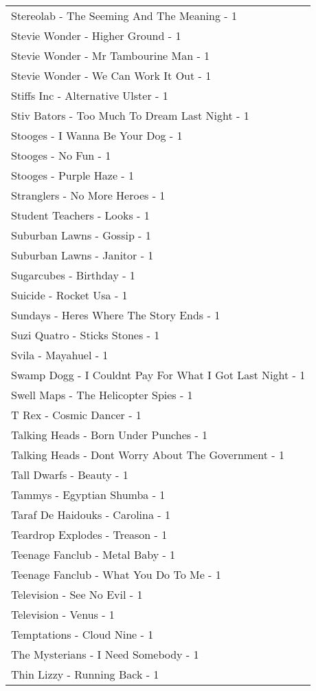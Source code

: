 \documentclass[
]{article}
\begin{document}
\begin{longtable}{l}
Stereolab - The Seeming And The Meaning - 1 \\ 
Stevie Wonder - Higher Ground - 1 \\ 
Stevie Wonder - Mr Tambourine Man - 1 \\ 
Stevie Wonder - We Can Work It Out - 1 \\ 
Stiffs Inc - Alternative Ulster - 1 \\ 
Stiv Bators - Too Much To Dream Last Night - 1 \\ 
Stooges - I Wanna Be Your Dog - 1 \\ 
Stooges - No Fun - 1 \\ 
Stooges - Purple Haze - 1 \\ 
Stranglers - No More Heroes - 1 \\ 
Student Teachers - Looks - 1 \\ 
Suburban Lawns - Gossip - 1 \\ 
Suburban Lawns - Janitor - 1 \\ 
Sugarcubes - Birthday - 1 \\ 
Suicide - Rocket Usa - 1 \\ 
Sundays - Heres Where The Story Ends - 1 \\ 
Suzi Quatro - Sticks Stones - 1 \\ 
Svila - Mayahuel - 1 \\ 
Swamp Dogg - I Couldnt Pay For What I Got Last Night - 1 \\ 
Swell Maps - The Helicopter Spies - 1 \\ 
T Rex - Cosmic Dancer - 1 \\ 
Talking Heads - Born Under Punches - 1 \\ 
Talking Heads - Dont Worry About The Government - 1 \\ 
Tall Dwarfs - Beauty - 1 \\ 
Tammys - Egyptian Shumba - 1 \\ 
Taraf De Haidouks - Carolina - 1 \\ 
Teardrop Explodes - Treason - 1 \\ 
Teenage Fanclub - Metal Baby - 1 \\ 
Teenage Fanclub - What You Do To Me - 1 \\ 
Television - See No Evil - 1 \\ 
Television - Venus - 1 \\ 
Temptations - Cloud Nine - 1 \\ 
The Mysterians - I Need Somebody - 1 \\ 
Thin Lizzy - Running Back - 1 \\ 

\end{longtable}
\end{document}

